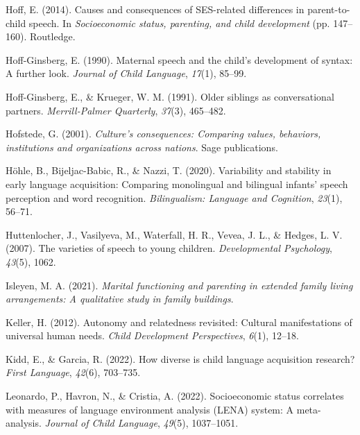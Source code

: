 \documentclass[
  man,floatsintext]{apa6}
\newlength{\cslhangindent}
\newlength{\cslentryspacingunit} %
\newenvironment{CSLReferences}[2] %
 {%
  \setlength{\parindent}{0pt}
  \ifodd #1
  \let\oldpar\par
  \def\par{\hangindent=\cslhangindent\oldpar}
  \fi
  \setlength{\parskip}{#2\cslentryspacingunit}
 }%
 {}
\begin{document}
\begin{CSLReferences}{1}{0}
\leavevmode{}%
Hoff, E. (2014). Causes and consequences of SES-related differences in parent-to-child speech. In \emph{Socioeconomic status, parenting, and child development} (pp. 147--160). Routledge.

\leavevmode{}%
Hoff-Ginsberg, E. (1990). Maternal speech and the child's development of syntax: A further look. \emph{Journal of Child Language}, \emph{17}(1), 85--99.

\leavevmode{}%
Hoff-Ginsberg, E., \& Krueger, W. M. (1991). Older siblings as conversational partners. \emph{Merrill-Palmer Quarterly}, \emph{37}(3), 465--482.

\leavevmode{}%
Hofstede, G. (2001). \emph{Culture's consequences: Comparing values, behaviors, institutions and organizations across nations}. Sage publications.

\leavevmode{}%
Höhle, B., Bijeljac-Babic, R., \& Nazzi, T. (2020). Variability and stability in early language acquisition: Comparing monolingual and bilingual infants' speech perception and word recognition. \emph{Bilingualism: Language and Cognition}, \emph{23}(1), 56--71.

\leavevmode{}%
Huttenlocher, J., Vasilyeva, M., Waterfall, H. R., Vevea, J. L., \& Hedges, L. V. (2007). The varieties of speech to young children. \emph{Developmental Psychology}, \emph{43}(5), 1062.

\leavevmode{}%
Isleyen, M. A. (2021). \emph{Marital functioning and parenting in extended family living arrangements: A qualitative study in family buildings}.

\leavevmode{}%
Keller, H. (2012). Autonomy and relatedness revisited: Cultural manifestations of universal human needs. \emph{Child Development Perspectives}, \emph{6}(1), 12--18.

\leavevmode{}%
Kidd, E., \& Garcia, R. (2022). How diverse is child language acquisition research? \emph{First Language}, \emph{42}(6), 703--735.

\leavevmode{}%
Leonardo, P., Havron, N., \& Cristia, A. (2022). Socioeconomic status correlates with measures of language environment analysis (LENA) system: A meta-analysis. \emph{Journal of Child Language}, \emph{49}(5), 1037--1051.


\end{CSLReferences}
\end{document}
